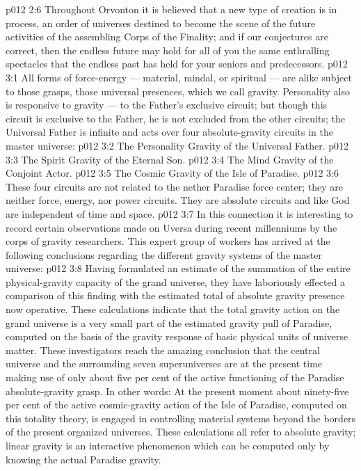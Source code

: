 \vs p012 2:6 Throughout Orvonton it is believed that a new type of creation is in process, an order of universes destined to become the scene of the future activities of the assembling Corps of the Finality; and if our conjectures are correct, then the endless future may hold for all of you the same enthralling spectacles that the endless past has held for your seniors and predecessors.
\vs p012 3:1 All forms of force\hyp{}energy --- material, mindal, or spiritual --- are alike subject to those grasps, those universal presences, which we call gravity. Personality also is responsive to gravity --- to the Father’s exclusive circuit; but though this circuit is exclusive to the Father, he is not excluded from the other circuits; the Universal Father is infinite and acts over  four absolute\hyp{}gravity circuits in the master universe:
\vs p012 3:2 \bibnobreakspace The Personality Gravity of the Universal Father.
\vs p012 3:3 \bibnobreakspace The Spirit Gravity of the Eternal Son.
\vs p012 3:4 \bibnobreakspace The Mind Gravity of the Conjoint Actor.
\vs p012 3:5 \bibnobreakspace The Cosmic Gravity of the Isle of Paradise.
\vs p012 3:6 \pc These four circuits are not related to the nether Paradise force center; they are neither force, energy, nor power circuits. They are absolute  circuits and like God are independent of time and space.
\vs p012 3:7 In this connection it is interesting to record certain observations made on Uversa during recent millenniums by the corps of gravity researchers. This expert group of workers has arrived at the following conclusions regarding the different gravity systems of the master universe:
\vs p012 3:8 \pc {}\bibnobreakspace {} Having formulated an estimate of the summation of the entire physical\hyp{}gravity capacity of the grand universe, they have laboriously effected a comparison of this finding with the estimated total of absolute gravity presence now operative. These calculations indicate that the total gravity action on the grand universe is a very small part of the estimated gravity pull of Paradise, computed on the basis of the gravity response of basic physical units of universe matter. These investigators reach the amazing conclusion that the central universe and the surrounding seven superuniverses are at the present time making use of only about five per cent of the active functioning of the Paradise absolute\hyp{}gravity grasp. In other words: At the present moment about ninety\hyp{}five per cent of the active cosmic\hyp{}gravity action of the Isle of Paradise, computed on this totality theory, is engaged in controlling material systems beyond the borders of the present organized universes. These calculations all refer to absolute gravity; linear gravity is an interactive phenomenon which can be computed only by knowing the actual Paradise gravity.
